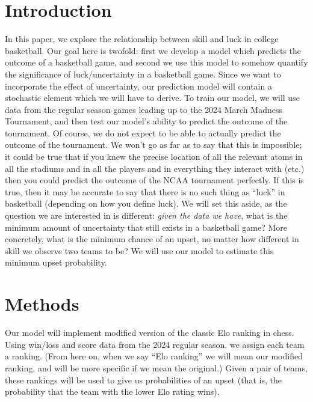 \documentclass{article}
\begin{document}
\section{Introduction}
In this paper, we explore the relationship between skill and luck in college basketball. Our goal here is twofold: first we develop a model which predicts the outcome of a basketball game, and second we use this model to somehow quantify the significance of luck/uncertainty in a basketball game. Since we want to incorporate the effect of uncertainty, our prediction model will contain a stochastic element which we will have to derive. To train our model, we will use data from the regular season games leading up to the 2024 March Madness Tournament, and then test our model's ability to predict the outcome of the tournament. Of course, we do not expect to be able to actually predict the outcome of the tournament. We won't go as far as to say that this is impossible; it could be true that if you knew the precise location of all the relevant atoms in all the stadiums and in all the players and in everything they interact with (etc.) then you could predict the outcome of the NCAA tournament perfectly. If this is true, then it may be accurate to say that there is no such thing as ``luck'' in basketball (depending on how you define luck). We will set this aside, as the question we are interested in is different: \textit{given the data we have}, what is the minimum amount of uncertainty that still exists in a basketball game? More concretely, what is the minimum chance of an upset, no matter how different in skill we observe two teams to be? We will use our model to estimate this minimum upset probability.

\section{Methods}

Our model will implement modified version of the classic Elo ranking in chess. Using win/loss and score data from the 2024 regular season, we assign each team a ranking. (From here on, when we say ``Elo ranking'' we will mean our modified ranking, and will be more specific if we mean the original.) Given a pair of teams, these rankings will be used to give us probabilities of an upset (that is, the probability that the team with the lower Elo rating wins). 
\end{document}
